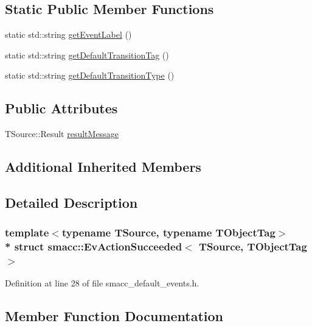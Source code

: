 \subsection*{Static Public Member Functions}
\begin{DoxyCompactItemize}
\item 
static std\+::string \hyperlink{structsmacc_1_1EvActionSucceeded_a8072fd41e4f5aa3302cca648ad842bf1}{get\+Event\+Label} ()
\item 
static std\+::string \hyperlink{structsmacc_1_1EvActionSucceeded_adef22fa07dc743bb64255c7575e81993}{get\+Default\+Transition\+Tag} ()
\item 
static std\+::string \hyperlink{structsmacc_1_1EvActionSucceeded_a2e2644bcf8d7e03add94a30091d72732}{get\+Default\+Transition\+Type} ()
\end{DoxyCompactItemize}
\subsection*{Public Attributes}
\begin{DoxyCompactItemize}
\item 
T\+Source\+::\+Result \hyperlink{structsmacc_1_1EvActionSucceeded_a6f040ef9c80080c840a10cd0603fdf33}{result\+Message}
\end{DoxyCompactItemize}
\subsection*{Additional Inherited Members}


\subsection{Detailed Description}
\subsubsection*{template$<$typename T\+Source, typename T\+Object\+Tag$>$\\*
struct smacc\+::\+Ev\+Action\+Succeeded$<$ T\+Source, T\+Object\+Tag $>$}



Definition at line 28 of file smacc\+\_\+default\+\_\+events.\+h.



\subsection{Member Function Documentation}
